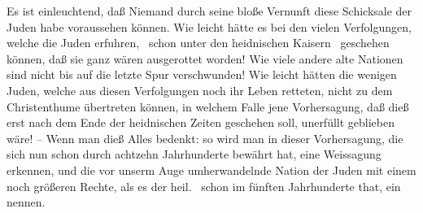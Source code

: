 \begin{aufza}
\item Es ist einleuchtend, daß Niemand durch seine bloße Vernunft diese Schicksale der Juden habe voraussehen können. Wie leicht hätte es bei den vielen Verfolgungen, welche die Juden erfuhren, \zB\ schon unter den heidnischen Kaisern  \uA\ geschehen können, daß sie ganz wären ausgerottet worden! Wie viele andere alte Nationen sind nicht bis auf die letzte Spur verschwunden! Wie leicht hätten die wenigen Juden, welche aus diesen Verfolgungen noch ihr Leben retteten, nicht zu dem Christenthume übertreten können, in welchem Falle jene Vorhersagung, daß dieß erst nach dem Ende der heidnischen Zeiten geschehen soll, unerfüllt geblieben wäre! -- Wenn man dieß Alles bedenkt: so wird man in dieser Vorhersagung, die sich nun schon durch achtzehn Jahrhunderte bewährt hat, eine Weissagung erkennen, und die vor unserm Auge umherwandelnde Nation der Juden mit einem noch größeren Rechte, als es der heil.\  schon im fünften Jahrhunderte that, ein  nennen.
\end{aufza}

